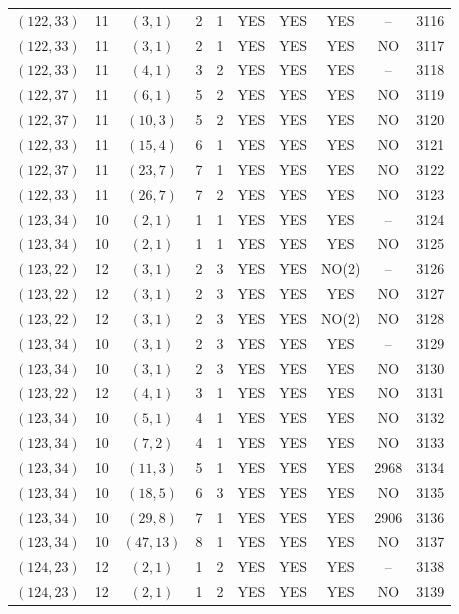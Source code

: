 \begin{longtable}{|c|c|c|c|c|c|c|c|c|c|}
$(122, 33)$ & 11 & $(3, 1)$ & 2 & 1 & YES & YES & YES & -- & 3116\\
$(122, 33)$ & 11 & $(3, 1)$ & 2 & 1 & YES & YES & YES & NO & 3117\\
$(122, 33)$ & 11 & $(4, 1)$ & 3 & 2 & YES & YES & YES & -- & 3118\\
$(122, 37)$ & 11 & $(6, 1)$ & 5 & 2 & YES & YES & YES & NO & 3119\\
$(122, 37)$ & 11 & $(10, 3)$ & 5 & 2 & YES & YES & YES & NO & 3120\\
$(122, 33)$ & 11 & $(15, 4)$ & 6 & 1 & YES & YES & YES & NO & 3121\\
$(122, 37)$ & 11 & $(23, 7)$ & 7 & 1 & YES & YES & YES & NO & 3122\\
$(122, 33)$ & 11 & $(26, 7)$ & 7 & 2 & YES & YES & YES & NO & 3123\\
$(123, 34)$ & 10 & $(2, 1)$ & 1 & 1 & YES & YES & YES & -- & 3124\\
$(123, 34)$ & 10 & $(2, 1)$ & 1 & 1 & YES & YES & YES & NO & 3125\\
$(123, 22)$ & 12 & $(3, 1)$ & 2 & 3 & YES & YES & NO(2) & -- & 3126\\
$(123, 22)$ & 12 & $(3, 1)$ & 2 & 3 & YES & YES & YES & NO & 3127\\
$(123, 22)$ & 12 & $(3, 1)$ & 2 & 3 & YES & YES & NO(2) & NO & 3128\\
$(123, 34)$ & 10 & $(3, 1)$ & 2 & 3 & YES & YES & YES & -- & 3129\\
$(123, 34)$ & 10 & $(3, 1)$ & 2 & 3 & YES & YES & YES & NO & 3130\\
$(123, 22)$ & 12 & $(4, 1)$ & 3 & 1 & YES & YES & YES & NO & 3131\\
$(123, 34)$ & 10 & $(5, 1)$ & 4 & 1 & YES & YES & YES & NO & 3132\\
$(123, 34)$ & 10 & $(7, 2)$ & 4 & 1 & YES & YES & YES & NO & 3133\\
$(123, 34)$ & 10 & $(11, 3)$ & 5 & 1 & YES & YES & YES & 2968 & 3134\\
$(123, 34)$ & 10 & $(18, 5)$ & 6 & 3 & YES & YES & YES & NO & 3135\\
$(123, 34)$ & 10 & $(29, 8)$ & 7 & 1 & YES & YES & YES & 2906 & 3136\\
$(123, 34)$ & 10 & $(47, 13)$ & 8 & 1 & YES & YES & YES & NO & 3137\\
$(124, 23)$ & 12 & $(2, 1)$ & 1 & 2 & YES & YES & YES & -- & 3138\\
$(124, 23)$ & 12 & $(2, 1)$ & 1 & 2 & YES & YES & YES & NO & 3139\\

\end{longtable}
